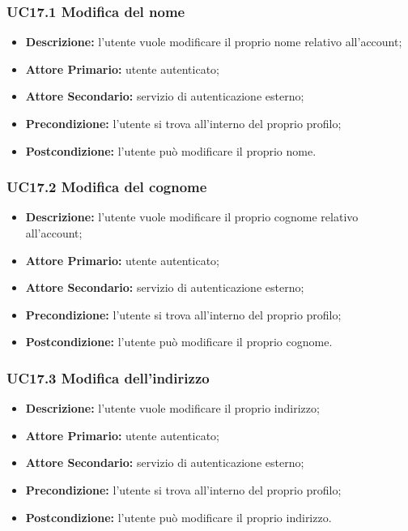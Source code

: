 \subsubsection{UC17.1 Modifica del nome}
\label{sec:UC17.1}
\begin{itemize}
    \item \textbf{Descrizione:} l'utente vuole modificare il proprio nome relativo all'account;
    \item \textbf{Attore Primario:} utente autenticato;
    \item \textbf{Attore Secondario:} servizio di autenticazione esterno;
    \item \textbf{Precondizione:} l'utente si trova all'interno del proprio profilo;
    \item \textbf{Postcondizione:} l'utente può modificare il proprio nome.
\end{itemize}

\subsubsection{UC17.2 Modifica del cognome}
\label{sec:UC17.2}
\begin{itemize}
    \item \textbf{Descrizione:} l'utente vuole modificare il proprio cognome relativo all'account;
    \item \textbf{Attore Primario:} utente autenticato;
    \item \textbf{Attore Secondario:} servizio di autenticazione esterno;
    \item \textbf{Precondizione:} l'utente si trova all'interno del proprio profilo;
    \item \textbf{Postcondizione:} l'utente può modificare il proprio cognome.
\end{itemize}

\subsubsection{UC17.3 Modifica dell'indirizzo}
\label{sec:UC17.3}
\begin{itemize}
    \item \textbf{Descrizione:} l'utente vuole modificare il proprio indirizzo;
    \item \textbf{Attore Primario:} utente autenticato;
    \item \textbf{Attore Secondario:} servizio di autenticazione esterno;
    \item \textbf{Precondizione:} l'utente si trova all'interno del proprio profilo;
    \item \textbf{Postcondizione:} l'utente può modificare il proprio indirizzo.
\end{itemize}
